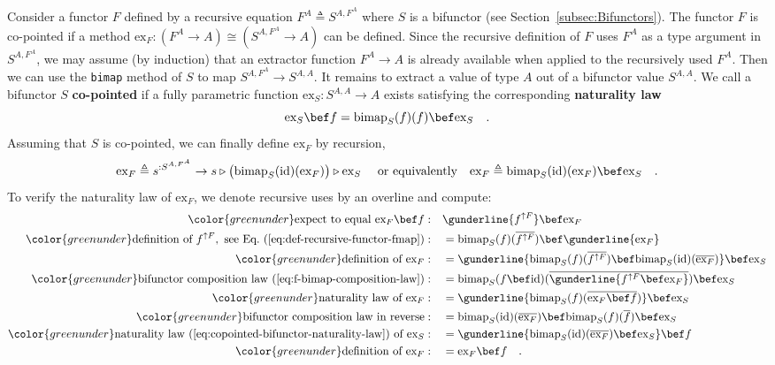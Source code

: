 Consider a functor $F$ defined by a recursive equation $F^{A}\triangleq S^{A,F^{A}}$
where $S$ is a bifunctor (see Section~\ref{subsec:Bifunctors}).
The functor $F$ is co-pointed if a method $\text{ex}_{F}:(F^{A}\rightarrow A)\cong(S^{A,F^{A}}\rightarrow A)$
can be defined. Since the recursive definition of $F$ uses $F^{A}$
as a type argument in $S^{A,F^{A}}$, we may assume (by induction)
that an extractor function $F^{A}\rightarrow A$ is already available
when applied to the recursively used $F^{A}$. Then we can use the
\lstinline!bimap! method of $S$ to map $S^{A,F^{A}}\rightarrow S^{A,A}$.
It remains to extract a value of type $A$ out of a bifunctor value
$S^{A,A}$. We call a bifunctor $S$ \textbf{co-pointed}
if a fully parametric function $\text{ex}_{S}:S^{A,A}\rightarrow A$
exists satisfying the corresponding \textbf{naturality law}
\begin{equation}
\text{ex}_{S}\bef f=\text{bimap}_{S}(f)(f)\bef\text{ex}_{S}\quad.\label{eq:copointed-bifunctor-naturality-law}
\end{equation}
Assuming that $S$ is co-pointed, we can finally define $\text{ex}_{F}$
by recursion,
\[
\text{ex}_{F}\triangleq s^{:S^{A,F^{A}}}\rightarrow s\triangleright\big(\text{bimap}_{S}(\text{id})(\text{ex}_{F})\big)\triangleright\text{ex}_{S}\quad\text{ or equivalently}\quad\text{ex}_{F}\triangleq\text{bimap}_{S}(\text{id})(\text{ex}_{F})\bef\text{ex}_{S}\quad.
\]
To verify the naturality law of $\text{ex}_{F}$, we denote recursive
uses by an overline and compute:
\begin{align*}
{\color{greenunder}\text{expect to equal }\text{ex}_{F}\bef f:}\quad & \gunderline{f^{\uparrow F}}\bef\text{ex}_{F}\\
{\color{greenunder}\text{definition of }f^{\uparrow F},\text{ see Eq.~(\ref{eq:def-recursive-functor-fmap})}:}\quad & =\text{bimap}_{S}(f)(\overline{f^{\uparrow F}})\bef\gunderline{\text{ex}_{F}}\\
{\color{greenunder}\text{definition of }\text{ex}_{F}:}\quad & =\gunderline{\text{bimap}_{S}(f)(\overline{f^{\uparrow F}})\bef\text{bimap}_{S}(\text{id})(\overline{\text{ex}_{F}})}\bef\text{ex}_{S}\\
{\color{greenunder}\text{bifunctor composition law~(\ref{eq:f-bimap-composition-law})}:}\quad & =\text{bimap}_{S}(f\bef\text{id})(\overline{\gunderline{f^{\uparrow F}\bef\text{ex}_{F}}})\bef\text{ex}_{S}\\
{\color{greenunder}\text{naturality law of }\text{ex}_{F}:}\quad & =\gunderline{\text{bimap}_{S}(f)(\overline{\text{ex}_{F}\bef f})}\bef\text{ex}_{S}\\
{\color{greenunder}\text{bifunctor composition law in reverse}:}\quad & =\text{bimap}_{S}(\text{id})(\overline{\text{ex}_{F}})\bef\text{bimap}_{S}(f)(\overline{f})\bef\text{ex}_{S}\\
{\color{greenunder}\text{naturality law~(\ref{eq:copointed-bifunctor-naturality-law}) of }\text{ex}_{S}:}\quad & =\gunderline{\text{bimap}_{S}(\text{id})(\overline{\text{ex}_{F}})\bef\text{ex}_{S}}\bef f\\
{\color{greenunder}\text{definition of }\text{ex}_{F}:}\quad & =\text{ex}_{F}\bef f\quad.
\end{align*}
